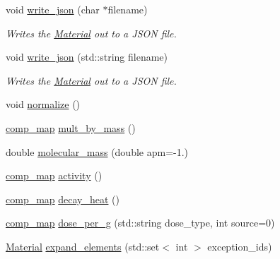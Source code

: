 \begin{DoxyCompactItemize}
\mbox{\label{classpyne_1_1_material_ab152859c735b74a049e24faa67111a62}} 
void \hyperlink{classpyne_1_1_material_ab152859c735b74a049e24faa67111a62}{write\+\_\+json} (char $\ast$filename)
\begin{DoxyCompactList}\small\item\em Writes the \hyperlink{classpyne_1_1_material}{Material} out to a J\+S\+ON file. \end{DoxyCompactList}\item 
\mbox{\label{classpyne_1_1_material_a2572b956404b64e2414bfea380324e9a}} 
void \hyperlink{classpyne_1_1_material_a2572b956404b64e2414bfea380324e9a}{write\+\_\+json} (std\+::string filename)
\begin{DoxyCompactList}\small\item\em Writes the \hyperlink{classpyne_1_1_material}{Material} out to a J\+S\+ON file. \end{DoxyCompactList}\item 
void \hyperlink{classpyne_1_1_material_ad27e37568bc08020d3886bb6284bc61d}{normalize} ()
\item 
\hyperlink{namespacepyne_a86738cecccf4ce3f4ecc2ff6f45ce1a2}{comp\+\_\+map} \hyperlink{classpyne_1_1_material_ad561ad2e529cbdcc0c73b10b067289fd}{mult\+\_\+by\+\_\+mass} ()
\item 
double \hyperlink{classpyne_1_1_material_a5adf1c262bbabfadf5a8491e7a434ae5}{molecular\+\_\+mass} (double apm=-\/1.)
\item 
\hyperlink{namespacepyne_a86738cecccf4ce3f4ecc2ff6f45ce1a2}{comp\+\_\+map} \hyperlink{classpyne_1_1_material_aae4cbb00f956e2b89fc30ec65124408e}{activity} ()
\item 
\hyperlink{namespacepyne_a86738cecccf4ce3f4ecc2ff6f45ce1a2}{comp\+\_\+map} \hyperlink{classpyne_1_1_material_afa2f1337b64376c13bcece406bbc70f1}{decay\+\_\+heat} ()
\item 
\hyperlink{namespacepyne_a86738cecccf4ce3f4ecc2ff6f45ce1a2}{comp\+\_\+map} \hyperlink{classpyne_1_1_material_a8a55933dccd966f7f3e29d21043bb0d5}{dose\+\_\+per\+\_\+g} (std\+::string dose\+\_\+type, int source=0)
\item 
\hyperlink{classpyne_1_1_material}{Material} \hyperlink{classpyne_1_1_material_a4c35931980a7a455f214c6b23c664f45}{expand\+\_\+elements} (std\+::set$<$ int $>$ exception\+\_\+ids)
\item 
\mbox{\label{classpyne_1_1_material_aa5c3999cc38baea6b0fea892035be318}} 

\end{DoxyCompactItemize}
